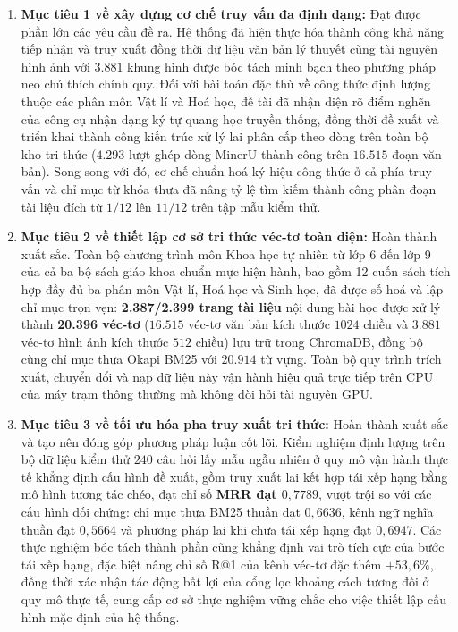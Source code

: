 \begin{enumerate}
    \item \textbf{Mục tiêu 1 về xây dựng cơ chế truy vấn đa định dạng:} Đạt được phần lớn các yêu cầu đề ra. Hệ thống đã hiện thực hóa thành công khả năng tiếp nhận và truy xuất đồng thời dữ liệu văn bản lý thuyết cùng tài nguyên hình ảnh với $3.881$ khung hình được bóc tách minh bạch theo phương pháp neo chú thích chính quy. Đối với bài toán đặc thù về công thức định lượng thuộc các phân môn Vật lí và Hoá học, đề tài đã nhận diện rõ điểm nghẽn của công cụ nhận dạng ký tự quang học truyền thống, đồng thời đề xuất và triển khai thành công kiến trúc xử lý lai phân cấp theo dòng trên toàn bộ kho tri thức ($4.293$ lượt ghép dòng MinerU thành công trên $16.515$ đoạn văn bản). Song song với đó, cơ chế chuẩn hoá ký hiệu công thức ở cả phía truy vấn và chỉ mục từ khóa thưa đã nâng tỷ lệ tìm kiếm thành công phân đoạn tài liệu đích từ $1/12$ lên $11/12$ trên tập mẫu kiểm thử.
    
    \item \textbf{Mục tiêu 2 về thiết lập cơ sở tri thức véc-tơ toàn diện:} Hoàn thành xuất sắc. Toàn bộ chương trình môn Khoa học tự nhiên từ lớp 6 đến lớp 9 của cả ba bộ sách giáo khoa chuẩn mực hiện hành, bao gồm 12 cuốn sách tích hợp đầy đủ ba phân môn Vật lí, Hoá học và Sinh học, đã được số hoá và lập chỉ mục trọn vẹn: \textbf{2.387/2.399 trang tài liệu} nội dung bài học được xử lý thành \textbf{20.396 véc-tơ} ($16.515$ véc-tơ văn bản kích thước $1024$ chiều và $3.881$ véc-tơ hình ảnh kích thước $512$ chiều) lưu trữ trong ChromaDB, đồng bộ cùng chỉ mục thưa Okapi BM25 với $20.914$ từ vựng. Toàn bộ quy trình trích xuất, chuyển đổi và nạp dữ liệu này vận hành hiệu quả trực tiếp trên CPU của máy trạm thông thường mà không đòi hỏi tài nguyên GPU.

    \item \textbf{Mục tiêu 3 về tối ưu hóa pha truy xuất tri thức:} Hoàn thành xuất sắc và tạo nên đóng góp phương pháp luận cốt lõi. Kiểm nghiệm định lượng trên bộ dữ liệu kiểm thử $240$ câu hỏi lấy mẫu ngẫu nhiên ở quy mô vận hành thực tế khẳng định cấu hình đề xuất, gồm truy xuất lai kết hợp tái xếp hạng bằng mô hình tương tác chéo, đạt chỉ số \textbf{MRR đạt $0{,}7789$}, vượt trội so với các cấu hình đối chứng: chỉ mục thưa BM25 thuần đạt $0{,}6636$, kênh ngữ nghĩa thuần đạt $0{,}5664$ và phương pháp lai khi chưa tái xếp hạng đạt $0{,}6947$. Các thực nghiệm bóc tách thành phần cũng khẳng định vai trò tích cực của bước tái xếp hạng, đặc biệt nâng chỉ số R@1 của kênh véc-tơ đặc thêm $+53{,}6\%$, đồng thời xác nhận tác động bất lợi của cổng lọc khoảng cách tương đối ở quy mô thực tế, cung cấp cơ sở thực nghiệm vững chắc cho việc thiết lập cấu hình mặc định của hệ thống.


\end{enumerate}
